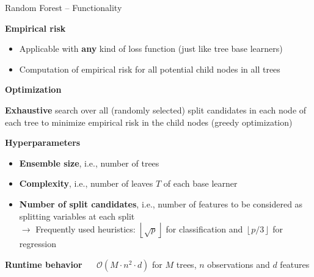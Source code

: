 \documentclass[11pt,compress,t,notes=noshow, xcolor=table]{beamer}
\newcommand{\highlight}[1]{\textcolor{highlightcol}{\textbf{#1}}}
\begin{document}

\begin{frame}{Random Forest -- Functionality}

\footnotesize

\highlight{Empirical risk}

\begin{itemize}
  \item Applicable with \textbf{any} kind of loss function (just like tree base 
  learners)
  \item Computation of empirical risk for all potential child nodes in all trees
\end{itemize}

\medskip

\highlight{Optimization}

\textbf{Exhaustive} search over
all (randomly selected) split candidates in each node of each tree to minimize
empirical risk in the child nodes (greedy optimization) \\

\medskip

\highlight{Hyperparameters}

\begin{itemize}
  \item \textbf{Ensemble size}, i.e., number of trees
  \item \textbf{Complexity}, i.e., number of leaves $T$ of each base learner
  \item \textbf{Number of split candidates}, i.e., number of features to be
  considered as splitting variables at each split \\
  $\rightarrow$ Frequently used heuristics: 
  $\left \lfloor{\sqrt{p}}\right \rfloor$ for classification and
  $\left \lfloor{p/3}\right \rfloor$ for regression
\end{itemize}

\medskip

\highlight{Runtime behavior} ~~
$\mathcal{O}(M \cdot n^2 \cdot d)$ for $M$ trees, $n$ observations and $d$ 
features
  
\end{frame}


\end{document}
